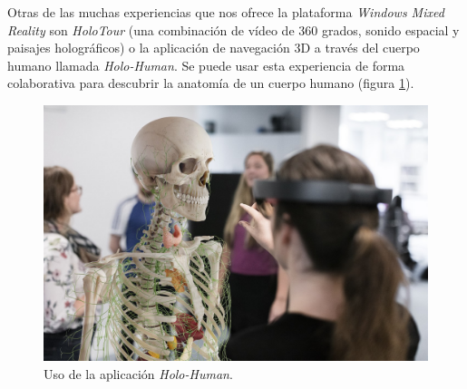 Otras de las muchas experiencias que nos ofrece la plataforma \textit{Windows Mixed Reality} son \textit{HoloTour} (una combinación de vídeo de 360 grados, sonido espacial y paisajes holográficos) o la aplicación de navegación 3D a través del cuerpo humano llamada \textit{Holo-Human}. Se puede usar esta experiencia de forma colaborativa para descubrir la anatomía de un cuerpo humano (figura \ref{fig:capturaHoloHuman}).

\begin{figure}[H]
    \centering
    \includegraphics[scale=0.18]{Images/Estado del arte/holohuman.jpeg}
    \caption[Uso de la aplicación \textit{Holo-Human}]{Uso de la aplicación \textit{Holo-Human}\footnotemark.}
    \label{fig:capturaHoloHuman}
\end{figure}



